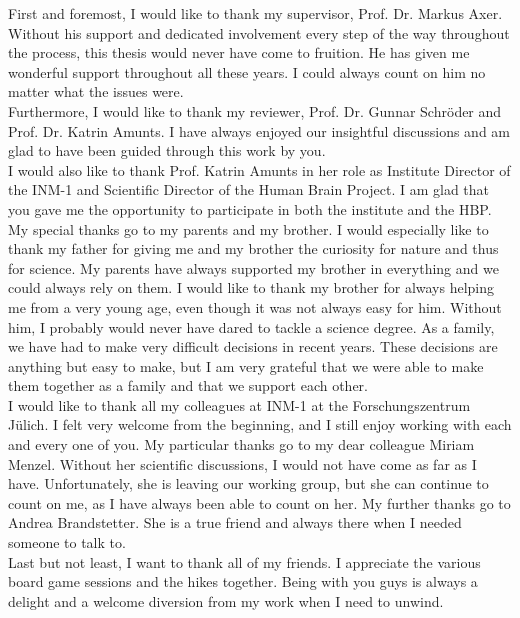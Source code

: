 \label{sec:acknowledgement}
%
First and foremost, I would like to thank my supervisor, Prof. Dr. Markus Axer.
Without his support and dedicated involvement every step of the way throughout the process, this thesis would never have come to fruition.
He has given me wonderful support throughout all these years.
I could always count on him no matter what the issues were.
\\
%
Furthermore, I would like to thank my reviewer, Prof. Dr. Gunnar Schr{\"o}der and Prof. Dr. Katrin Amunts.
I have always enjoyed our insightful discussions and am glad to have been guided through this work by you.
\\
%
I would also like to thank Prof. Katrin Amunts in her role as Institute Director of the INM-1 and Scientific Director of the Human Brain Project.
I am glad that you gave me the opportunity to participate in both the institute and the HBP.
\\
%
My special thanks go to my parents and my brother.
I would especially like to thank my father for giving me and my brother the curiosity for nature and thus for science.
My parents have always supported my brother in everything and we could always rely on them.
I would like to thank my brother for always helping me from a very young age, even though it was not always easy for him.
Without him, I probably would never have dared to tackle a science degree.
As a family, we have had to make very difficult decisions in recent years.
These decisions are anything but easy to make, but I am very grateful that we were able to make them together as a family and that we support each other.
\\
%
I would like to thank all my colleagues at INM-1 at the Forschungszentrum J{\"u}lich.
I felt very welcome from the beginning, and I still enjoy working with each and every one of you.
My particular thanks go to my dear colleague Miriam Menzel.
Without her scientific discussions, I would not have come as far as I have.
Unfortunately, she is leaving our working group, but she can continue to count on me, as I have always been able to count on her.
My further thanks go to Andrea Brandstetter.
She is a true friend and always there when I needed someone to talk to.
\\
%
Last but not least, I want to thank all of my friends.
I appreciate the various board game sessions and the hikes together.
Being with you guys is always a delight and a welcome diversion from my work when I need to unwind. 
